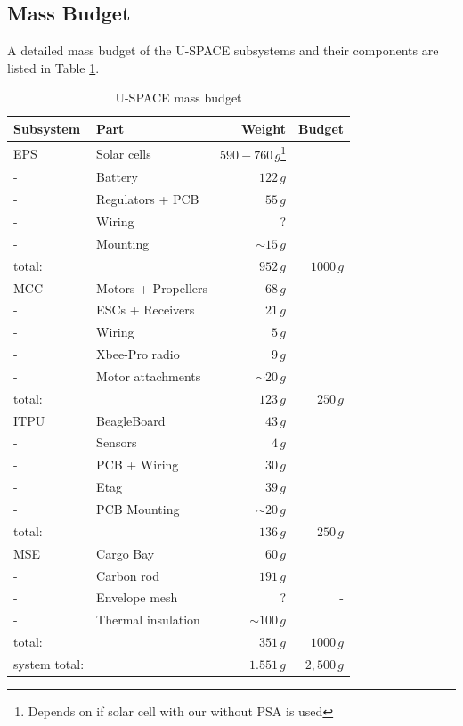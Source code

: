 \subsection{Mass Budget}
%
A detailed mass budget of the U-SPACE subsystems and their components are listed in Table \ref{tab:mass_budget}.
%
\begin{table}[H]
\caption{U-SPACE mass budget}
\label{tab:mass_budget}
\begin{minipage}{\textwidth}
\centering
\begin{tabular}{llrr}
\hline
\textbf{Subsystem} & \textbf{Part} & \textbf{Weight} & \textbf{Budget}\\ 
\hline
EPS & Solar cells & $590-760\,g$\footnote{Depends on if solar cell with our without PSA is used} & \\
- & Battery & $122\,g$ & \\
- & Regulators + PCB & $55\,g$ & \\
- & Wiring & ? & \\
- & Mounting & $\sim 15\,g$ & \\
total: & & $952\,g$ & $1000\,g$\\
\hline
MCC & Motors + Propellers & $68\,g$ & \\
- & ESCs + Receivers & $21\,g$ & \\
- & Wiring & $5\,g$ & \\
- & Xbee-Pro radio  & $9\,g$ & \\
- & Motor attachments & $\sim 20\,g$ &  \\
total: & & $123\,g$ & $250\,g$\\
\hline
ITPU & BeagleBoard & $43\,g$ & \\
- & Sensors & $4\,g$ &  \\
- & PCB + Wiring & $30\,g$ &  \\
- & Etag & $39\,g$ &  \\
- & PCB Mounting & $\sim 20\,g$ & \\
total: & & $136\,g$ & $250\,g$ \\
\hline
MSE & Cargo Bay & $60\,g$ &  \\
- & Carbon rod & $191\,g$ &  \\
- & Envelope mesh & ? & - \\
- & Thermal insulation & $\sim 100\,g$ \\
total: & & $351\,g$ & $1000\,g$ \\
\hline\hline
system total: & & $1.551\,g$ & $2,500\,g$\\
\hline
\end{tabular}\par
\vspace{-0.75\skip\footins}
\renewcommand{\footnoterule}{}
\end{minipage}
\end{table}
%
